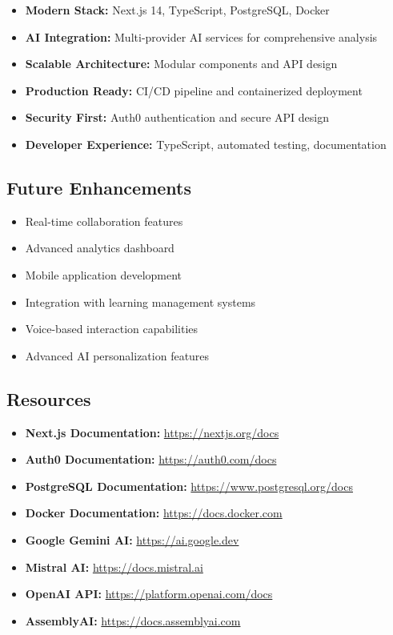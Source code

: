 \documentclass[12pt,a4paper]{article}
\begin{document}
\begin{itemize}
    \item \textbf{Modern Stack:} Next.js 14, TypeScript, PostgreSQL, Docker
    \item \textbf{AI Integration:} Multi-provider AI services for comprehensive analysis
    \item \textbf{Scalable Architecture:} Modular components and API design
    \item \textbf{Production Ready:} CI/CD pipeline and containerized deployment
    \item \textbf{Security First:} Auth0 authentication and secure API design
    \item \textbf{Developer Experience:} TypeScript, automated testing, documentation
\end{itemize}

\subsection{Future Enhancements}

\begin{itemize}
    \item Real-time collaboration features
    \item Advanced analytics dashboard
    \item Mobile application development
    \item Integration with learning management systems
    \item Voice-based interaction capabilities
    \item Advanced AI personalization features
\end{itemize}

\subsection{Resources}

\begin{itemize}
    \item \textbf{Next.js Documentation:} \url{https://nextjs.org/docs}
    \item \textbf{Auth0 Documentation:} \url{https://auth0.com/docs}
    \item \textbf{PostgreSQL Documentation:} \url{https://www.postgresql.org/docs}
    \item \textbf{Docker Documentation:} \url{https://docs.docker.com}
    \item \textbf{Google Gemini AI:} \url{https://ai.google.dev}
    \item \textbf{Mistral AI:} \url{https://docs.mistral.ai}
    \item \textbf{OpenAI API:} \url{https://platform.openai.com/docs}
    \item \textbf{AssemblyAI:} \url{https://docs.assemblyai.com}
\end{itemize}
\end{document}
